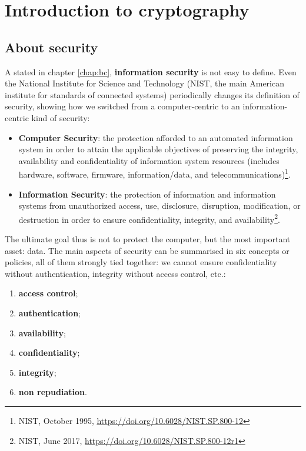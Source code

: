 \chapter{Introduction to cryptography} %
\label{ch:intro_crypto}


\section{About security}
A stated in chapter \ref{chap:bc}, \textbf{information security} is not easy to define. Even the National Institute for Science and Technology (NIST, the main American institute for standards of connected systems) periodically changes its definition of security, showing how we switched from a computer-centric to an information-centric kind of security:

\begin{itemize}
    \item \textbf{Computer Security}: the protection afforded to an automated information system in order to attain the applicable objectives of preserving the integrity, availability and confidentiality of information system resources (includes hardware, software, firmware, information/data, and telecommunications)\footnote{NIST, October 1995, \url{https://doi.org/10.6028/NIST.SP.800-12}}.
    \item \textbf{Information Security}: the protection of information and information systems from unauthorized access, use, disclosure, disruption, modification, or destruction in order to ensure confidentiality, integrity, and availability\footnote{NIST, June 2017, \url{https://doi.org/10.6028/NIST.SP.800-12r1}}.
\end{itemize}

The ultimate goal thus is not to protect the computer, but the most important asset: data. The main aspects of security can be summarised in six concepts or policies, all of them strongly tied together: we cannot ensure confidentiality without authentication, integrity without access control, etc.:

\begin{enumerate}
    \item \textbf{access control};
    \item \textbf{authentication};
    \item \textbf{availability};
    \item \textbf{confidentiality};
    \item \textbf{integrity};
    \item \textbf{non repudiation}.
\end{enumerate}

